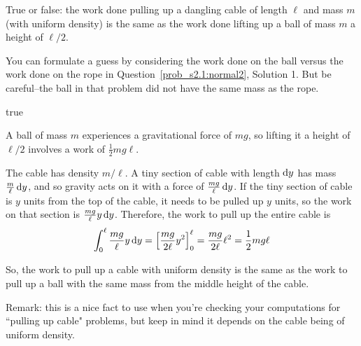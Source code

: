 \begin{Mquestion}
True or false: the work done pulling up a dangling cable of length $\ell$ and mass $m$ (with uniform density) is the same as the work done lifting up a ball of mass $m$ a height of $\ell/2$.

\begin{center}
\hspace{2cm}
\end{center}
\end{Mquestion}
\begin{hint}
You can formulate a guess by considering the work done on the ball versus the work done on the rope in Question~\ref{prob_s2.1:normal2}, Solution 1. But be careful--the ball in that problem did not have the same mass as the rope.
\end{hint}
\begin{answer}
true
\end{answer}
\begin{solution}
A ball of mass $m$ experiences a gravitational force of $mg$, so lifting it a height of $\ell/2$ involves a work of $\frac{1}{2}mg\ell$.

The cable has density $m/\ell$. A tiny section of cable with length $\mathrm{d}y$ has mass $\frac{m}{\ell}\,\mathrm{d}y$, and so gravity acts on it with a force of $\frac{mg}{\ell}\,\mathrm{d}y$. If the tiny section of cable is $y$ units from the top of the cable, it needs to be pulled up $y$ units, so the work on that section is $\frac{mg}{\ell}y\,\mathrm{d}y$. Therefore, the work to pull up the entire cable is
\[\int_0^\ell \frac{mg}{\ell}y\,\mathrm{d}y = \left[\frac{mg}{2\ell}y^2\right]_0^\ell = \frac{mg}{2\ell}\ell^2 = \frac{1}{2}mg\ell\]

So, the work to pull up a cable with uniform density is the same as the work to pull up a ball with the same mass from the middle height of the cable.

Remark: this is a nice fact to use when you're checking your computations for ``pulling up cable" problems, but keep in mind it depends on the cable being of uniform density.
\end{solution}


